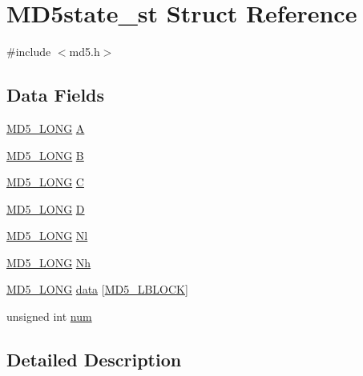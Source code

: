 \hypertarget{struct_m_d5state__st}{}\section{M\+D5state\+\_\+st Struct Reference}
\label{struct_m_d5state__st}


{\ttfamily \#include $<$md5.\+h$>$}

\subsection*{Data Fields}
\begin{DoxyCompactItemize}
\item 
\hyperlink{include_2openssl_2md5_8h_a9823dc2539b5bd2e5dfc531d5b1c64db}{M\+D5\+\_\+\+L\+O\+NG} \hyperlink{struct_m_d5state__st_a25d52493de39cc49240458df3f8a9dd1}{A}
\item 
\hyperlink{include_2openssl_2md5_8h_a9823dc2539b5bd2e5dfc531d5b1c64db}{M\+D5\+\_\+\+L\+O\+NG} \hyperlink{struct_m_d5state__st_a890388c772cb0780641341a16f315397}{B}
\item 
\hyperlink{include_2openssl_2md5_8h_a9823dc2539b5bd2e5dfc531d5b1c64db}{M\+D5\+\_\+\+L\+O\+NG} \hyperlink{struct_m_d5state__st_a3291114b2da7fbfc5ec7040e01a520c1}{C}
\item 
\hyperlink{include_2openssl_2md5_8h_a9823dc2539b5bd2e5dfc531d5b1c64db}{M\+D5\+\_\+\+L\+O\+NG} \hyperlink{struct_m_d5state__st_ad09ad8fc5658de9909f835ccd5038407}{D}
\item 
\hyperlink{include_2openssl_2md5_8h_a9823dc2539b5bd2e5dfc531d5b1c64db}{M\+D5\+\_\+\+L\+O\+NG} \hyperlink{struct_m_d5state__st_a4fa58b55fcc2cd73bfbda1b166243a97}{Nl}
\item 
\hyperlink{include_2openssl_2md5_8h_a9823dc2539b5bd2e5dfc531d5b1c64db}{M\+D5\+\_\+\+L\+O\+NG} \hyperlink{struct_m_d5state__st_a7362a80e3b02c14730028378a8207cc3}{Nh}
\item 
\hyperlink{include_2openssl_2md5_8h_a9823dc2539b5bd2e5dfc531d5b1c64db}{M\+D5\+\_\+\+L\+O\+NG} \hyperlink{struct_m_d5state__st_ab9756be3f7c4e126da5d969bccfda0ee}{data} \mbox{[}\hyperlink{include_2openssl_2md5_8h_a8ddf53027505210f2be7d42e9069ce2e}{M\+D5\+\_\+\+L\+B\+L\+O\+CK}\mbox{]}
\item 
unsigned int \hyperlink{struct_m_d5state__st_a41ddefd3473727cad32a9767c10faed8}{num}
\end{DoxyCompactItemize}


\subsection{Detailed Description}


